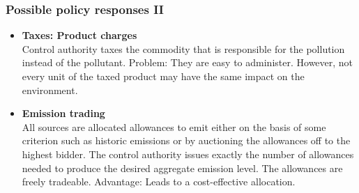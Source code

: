   \begin{frame}
  \frametitle{Possible policy responses II}
  \begin{itemize}
  \item<1-> \textbf{Taxes: Product charges} \\
        Control authority taxes the commodity that is responsible for the pollution instead of the pollutant. %
        Problem: They are easy to administer. However, not every unit of the taxed product may have the same impact on the environment. \\
  \item<2-> \textbf{Emission trading} \\
        All sources are allocated allowances to emit either on the basis of some criterion such as historic emissions or by auctioning the allowances off to the highest bidder.
        The control authority issues exactly the number of allowances needed to produce the desired aggregate emission level.
        The allowances are freely tradeable.
        Advantage: Leads to a cost-effective allocation.
  \end{itemize}
\end{frame}

